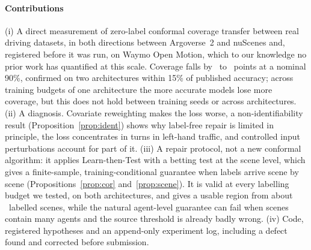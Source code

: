 \paragraph*{Contributions}
(i) A direct measurement of zero-label conformal coverage transfer between real driving datasets, in both directions
between Argoverse~2 and nuScenes and, registered before it was run, on Waymo Open Motion, which to our knowledge no
prior work has quantified at this scale. Coverage falls by \gapRawWayformer\ to \wmGapWf\ points at a nominal 90\%, confirmed on
two architectures within 15\% of published accuracy; across training budgets of one architecture the more accurate models lose more
coverage, but this does not hold between training seeds or across architectures. (ii) A diagnosis. Covariate reweighting makes the loss
worse, a non-identifiability result (Proposition~\ref{prop:ident}) shows why label-free repair is limited in
principle, the loss concentrates in turns in left-hand traffic, and controlled input perturbations account for part of it. (iii) A repair protocol, not a new
conformal algorithm: it applies Learn-then-Test with a betting test at the scene level, which gives a finite-sample,
training-conditional guarantee when labels arrive scene by scene (Propositions~\ref{prop:cor} and~\ref{prop:scene}).
It is valid at every labelling budget we tested, on both
architectures, and gives a usable region from about \recMMin\ labelled scenes, while the natural agent-level
guarantee can fail when scenes contain many agents and the source threshold is already badly wrong. (iv) Code,
registered hypotheses and an append-only experiment log, including a defect found and corrected before submission.
